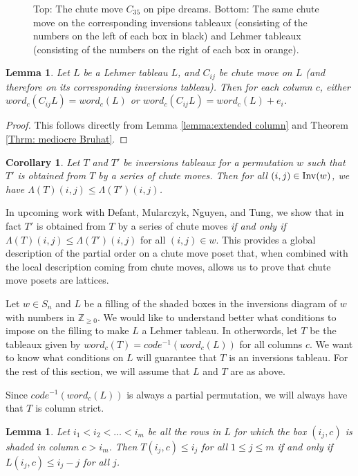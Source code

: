 \documentclass{article}
\newtheorem{lemma}[theorem]{Lemma}
\newtheorem{corollary}[theorem]{Corollary}
\theoremstyle{definition}
\begin{document}
\begin{figure}[h]
\caption{Top: The chute move $C_{35}$ on pipe dreams. Bottom: The same chute move on the corresponding inversions tableaux (consisting of the numbers on the left of each box in black) and Lehmer tableaux (consisting of the numbers on the right of each box in orange).}
\end{figure}


\begin{lemma}
   Let $L$ be a Lehmer tableau $L$, and $C_{ij}$ be chute move on $L$ (and therefore on its corresponding inversions tableau). Then for each column $c$,
   either $word_c(C_{ij}L) = word_c(L)$ or $word_c(C_{ij}L) = word_c(L) + e_i$.
 
\end{lemma}
\begin{proof}
    This follows directly from Lemma \ref{lemma:extended column} and Theorem \ref{Thrm: mediocre Bruhat}.
\end{proof}




\begin{corollary}Let $T$ and $T'$ be inversions tableaux for a permutation $w$ such that $T'$ is obtained from $T$ by a series of chute moves. Then for all $(i,j) \in \mathrm{Inv}(w)$, we have $\Lambda(T)(i,j) \leq \Lambda(T')(i,j)$.\end{corollary}

In upcoming work with Defant, Mularczyk, Nguyen, and Tung, we show that in fact $T'$ is obtained from $T$ by a series of chute moves \emph{if and only if} $\Lambda(T)(i,j) \leq \Lambda(T')(i,j)$ for all $(i,j) \in w$. This provides a global description of the partial order on a chute move poset that, when combined with the local description coming from chute moves, allows us to prove that chute move posets are lattices.

Let $w \in S_n$ and $L$ be a filling of the shaded boxes in the inversions diagram of $w$ with numbers in $\mathbb{Z}_{\geq 0}$. We would like to understand better what conditions to impose on the filling to make $L$ a Lehmer tableau. In otherwords, let $T$ be the tableaux given by $word_c(T) = code^{-1}(word_c(L))$ for all columns $c$. We want to know what conditions on $L$ will guarantee that $T$ is an inversions tableau. For the rest of this section, we will assume that $L$ and $T$ are as above.

Since $code^{-1}(word_c(L))$ is always a partial permutation, we will always have that $T$ is column strict.

\begin{lemma}
    Let $i_1 < i_2 < \dots < i_m$ be all the rows in $L$ for which the box $(i_j,c)$ is shaded in column $c > i_m$. Then $T(i_j,c) \leq i_j$ for all $1 \leq j \leq m$ if and only if $L(i_j,c) \leq i_j - j$ for all $j$.
\end{lemma}
\end{document}
